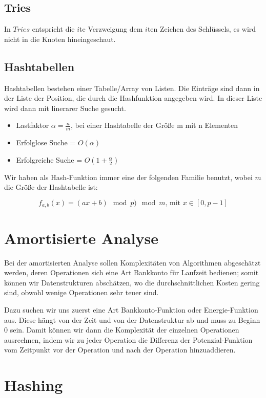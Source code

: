 \documentclass[11pt]{scrartcl}
\begin{document}
\subsection{Tries}
In $Tries$ entspricht die $i$te Verzweigung dem $i$ten Zeichen des Schlüssels, es wird nicht in die Knoten hineingeschaut.

\subsection{Hashtabellen}

Hashtabellen bestehen einer Tabelle/Array von Listen. Die Einträge sind dann in der Liste der Position, die durch die Hashfunktion angegeben wird. In dieser Liste wird dann mit linerarer Suche gesucht.

\begin{itemize}
	\item Lastfaktor $\alpha = \frac{n}{m}$, bei einer Hashtabelle der Größe m mit n Elementen
    \item Erfolglose Suche = $O(\alpha)$
    \item Erfolgreiche Suche = $O(1+\frac{\alpha}{2})$
\end{itemize}

Wir haben als Hash-Funktion immer eine der folgenden Familie benutzt, wobei $m$ die Größe der Hashtabelle ist:

$$f_{a,b}(x)=(ax+b) \mod p) \mod m \text{, mit } x \in [0,p-1]$$

\section{Amortisierte Analyse}

Bei der amortisierten Analyse sollen Komplexitäten von Algorithmen abgeschätzt werden, deren Operationen sich eine Art Bankkonto für Laufzeit bedienen; somit können wir Datenstrukturen abschätzen, wo die durchschnittlichen Kosten gering sind, obwohl wenige Operationen sehr teuer sind.

Dazu suchen wir uns zuerst eine Art Bankkonto-Funktion oder Energie-Funktion aus. Diese hängt von der Zeit und von der Datenstruktur ab und muss zu Beginn 0 sein. Damit können wir dann die Komplexität der einzelnen Operationen ausrechnen, indem wir zu jeder Operation die Differenz der Potenzial-Funktion vom Zeitpunkt vor der Operation und nach der Operation hinzuaddieren.

\section{Hashing}
\end{document}

